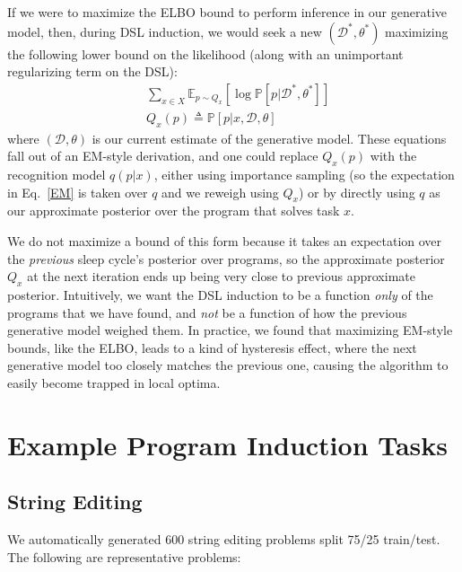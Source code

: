 \documentclass{article}
\newcommand{\expect}{\mathds{E}} %
\newcommand{\probability}{\mathds{P}} %
\begin{document}
If we were to maximize the ELBO bound to perform inference in
our generative model,
then, during DSL induction, we would seek a new $(\mathcal{D}^*,\theta^*)$ maximizing the following lower bound on the likelihood (along with an unimportant regularizing term on the DSL):
\begin{align}
  &  \sum_{x\in X}\expect_{p\sim Q_x}\left[\log \probability[p|\mathcal{D}^*,\theta^*] \right] \label{EM}\\
  & Q_x(p)\triangleq \probability[p|x,\mathcal{D},\theta]
\end{align}
where $(\mathcal{D},\theta)$ is our current estimate of the generative
model.  These equations fall out of an EM-style derivation, and one
could replace $Q_x(p)$ with the recognition model $q(p|x)$, either
using importance sampling (so the expectation in Eq.~\ref{EM} is taken
over $q$ and we reweigh using $Q_x$) or by directly using $q$ as our approximate posterior over the program that solves task $x$.

We do not maximize a bound of this form because it
takes an expectation over the \emph{previous} sleep cycle's
posterior over programs,
so the approximate posterior $Q_x$ at the next iteration
ends up being very close to previous approximate posterior.
Intuitively,
we want the DSL induction to be a function \emph{only} of the programs that we have found,
and \emph{not} be a function of how the previous generative model weighed them.
In practice,
we found that maximizing EM-style bounds, like the ELBO,
leads to a kind of hysteresis effect,
where the next generative model too closely matches the previous one,
causing the algorithm to easily become trapped in local optima.

\section{Example Program Induction Tasks}

\subsection{String Editing}

We automatically generated 600 string editing problems split 75/25 train/test.
The following are representative problems:
\end{document}
